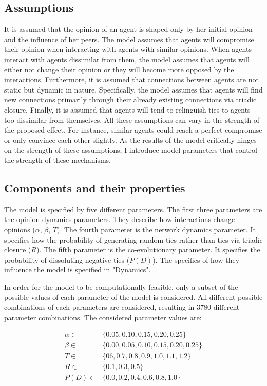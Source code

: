 \documentclass{article}
\begin{document}
\subsection{Assumptions}
It is assumed that the opinion of an agent is shaped only by her initial opinion and the influence of her peers. 
The model assumes that agents will compromise their opinion when interacting with agents with similar opinions. 
When agents interact with agents dissimilar from them, the model assumes that agents will either not change their opinion or they will become more opposed by the interactions.
Furthermore, it is assumed that connections between agents are not static but dynamic in nature. 
Specifically, the model assumes that agents will find new connections primarily through their already existing connections via triadic closure. Finally, it is assumed that agents will tend to relinguish ties to agents too dissimilar from themselves.
All these assumptions can vary in the strength of the proposed effect. For instance, similar agents could reach a perfect compromise or only convince each other slightly. 
As the results of the model critically hinges on the strength of these assumptions, I introduce model parameters that control the strength of these mechanisms.


\subsection{Components and their properties}
The model is specified by five different parameters. 
The first three parameters are the opinion dynamics parameters. They describe how interactions change opinions ($\alpha$, $\beta$, $T$). 
The fourth parameter is the network dynamics parameter. It specifies how the probability of generating random ties rather than ties via triadic closure ($R$).
The fifth parameter is the co-evolutionary parameter. It specifies the probability of dissoluting negative ties ($P(D)$).
The specifics of how they influence the model is specified in "Dynamics".  

In order for the model to be computationally feasible, only a subset of the possible values of each parameter of the model is considered. All different possible combinations of each parameters are considered, resulting in 3780 different parameter combinations. The considered parameter values are:


\begin{align*}
    \alpha \in & \{0.05, 0.10, 0.15, 0.20, 0.25\} \\
    \beta \in & \{0.00, 0.05, 0.10, 0.15, 0.20, 0.25\}\\
    T \in & \{06, 0.7, 0.8, 0.9, 1.0, 1.1, 1.2\}\\
    R \in & \{0.1, 0.3, 0.5\} \\
    P(D) \in & \{0.0, 0.2, 0.4, 0.6, 0.8, 1.0\}\\
\end{align*}
\end{document}
